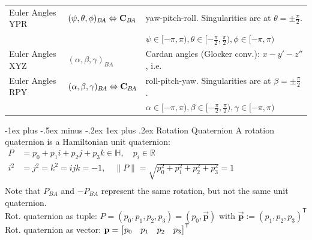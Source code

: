\documentclass[10pt,landscape,a4paper]{article}
\makeatletter
\renewcommand{\subsubsection}{\@startsection{subsubsection}{3}{0mm}%
                                {-1ex plus -.5ex minus -.2ex}%
                                {1ex plus .2ex}%
                                {\normalfont\small\bfseries}}
\newcommand\norm[1]{\lVert #1 \rVert}
\newcommand\transpose{\mathsf{T}}
\newcommand\imquatvec[1]{\overrightarrow{\mathbf{#1}}}
\newcommand\comat[2]{\vC_{#1\!#2}}
\newcommand\Quat[2]{P_{#1\!#2}}
\makeatother
\begin{document}
\begin{multicols}{2}
\begin{tabular}{|l|l@{}|l@{}|}
Euler Angles YPR & $(\psi, \theta, \phi)_{B\!A} \Leftrightarrow \comat{B}{A} $ & yaw-pitch-roll. Singularities are at $\theta=\pm\frac{\pi}{2}$. \\
 &  & $\psi\in[-\pi,\pi), \theta\in[-\frac{\pi}{2},\frac{\pi}{2}), \phi\in[-\pi,\pi)$  \\  \hline
Euler Angles XYZ &  $(\alpha, \beta, \gamma)_{B\!A}$ & Cardan angles (Glocker conv.): $x-y'-z''$, i.e.\ \\
Euler Angles RPY & $(\alpha, \beta, \gamma)_{B\!A} \Leftrightarrow \comat{B}{A}$ & roll-pitch-yaw. Singularities are at $\beta=\pm\frac{\pi}{2}$.  \\
 &  & $\alpha\in[-\pi,\pi), \beta\in[-\frac{\pi}{2},\frac{\pi}{2}), \gamma\in[-\pi,\pi)$  \\  \hline
\end{tabular} %

\subsubsection{Rotation Quaternion}
A rotation quaternion is a Hamiltonian unit quaternion: \\
$\boxed{\begin{aligned}P &= p_0 + p_1 i + p_2 j + p_3 k \in \mathbb{H}, \quad p_i \in \mathbb{R} \\
i^2 &= j^2=k^2 = ijk = -1, \quad \norm{P}= \sqrt{p_0^2 + p_1^2 + p_2^2 + p_3^2} = 1 \\
\end{aligned}}$   \\
Note that $\Quat{B}{A}$ and $-\Quat{B}{A}$ represent the same rotation, but not the same unit quaternion. \\
Rot. quaternion as tuple: $P = (p_0, p_1, p_2, p_3) = (p_0, \imquatvec{p})$ with $\imquatvec{p} := (p_1, p_2, p_3)^\transpose $ \\
Rot. quaternion as vector: $\vp = \begin{bmatrix} p_0 & p_1 & p_2 & p_3 \end{bmatrix}^\transpose $\\



\end{multicols}
\end{document}
